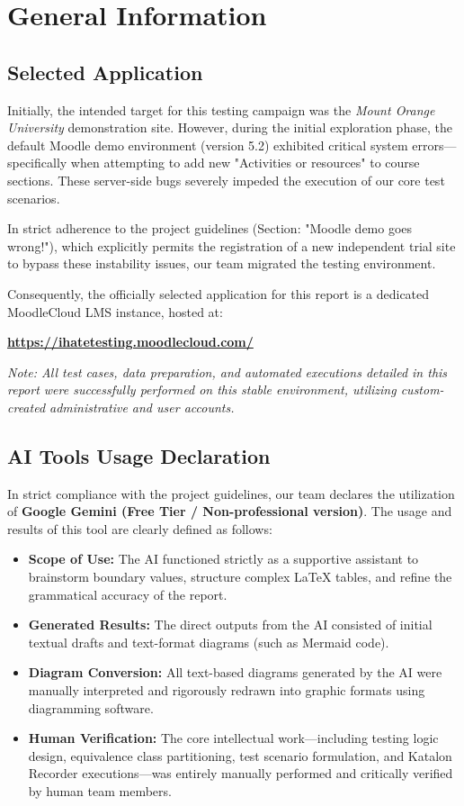 \documentclass[twoside,final]{hcmut-report}
\begin{document}
\section{General Information}

\subsection{Selected Application}
Initially, the intended target for this testing campaign was the \textit{Mount Orange University} demonstration site. However, during the initial exploration phase, the default Moodle demo environment (version 5.2) exhibited critical system errors—specifically when attempting to add new "Activities or resources" to course sections. These server-side bugs severely impeded the execution of our core test scenarios.

In strict adherence to the project guidelines (Section: "Moodle demo goes wrong!"), which explicitly permits the registration of a new independent trial site to bypass these instability issues, our team migrated the testing environment. 

Consequently, the officially selected application for this report is a dedicated MoodleCloud LMS instance, hosted at: 
\begin{center}
    \textbf{\url{https://ihatetesting.moodlecloud.com/}}
\end{center}

\textit{Note: All test cases, data preparation, and automated executions detailed in this report were successfully performed on this stable environment, utilizing custom-created administrative and user accounts.}

\subsection{AI Tools Usage Declaration}
In strict compliance with the project guidelines, our team declares the utilization of \textbf{Google Gemini (Free Tier / Non-professional version)}. The usage and results of this tool are clearly defined as follows:

\begin{itemize}
    \item \textbf{Scope of Use:} The AI functioned strictly as a supportive assistant to brainstorm boundary values, structure complex \LaTeX{} tables, and refine the grammatical accuracy of the report.
    \item \textbf{Generated Results:} The direct outputs from the AI consisted of initial textual drafts and text-format diagrams (such as Mermaid code). 
    \item \textbf{Diagram Conversion:} All text-based diagrams generated by the AI were manually interpreted and rigorously redrawn into graphic formats using diagramming software.
    \item \textbf{Human Verification:} The core intellectual work—including testing logic design, equivalence class partitioning, test scenario formulation, and Katalon Recorder executions—was entirely manually performed and critically verified by human team members.
\end{itemize}
\end{document}
